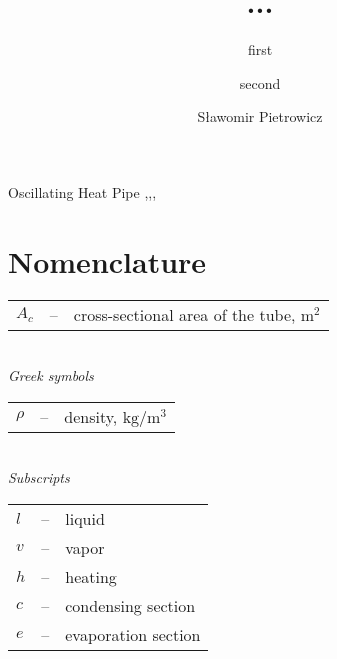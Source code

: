 \documentclass[review]{elsarticle}
\begin{document}
\begin{frontmatter}

\title{...}
 
 \author[pwr]{first}
 
 \author[pwr]{second}
   
 \author[pwr]{S\l awomir Pietrowicz}
 
 
 \address[pwr]{Department of Thermodynamics, Theory of Machines and Thermal Systems, Faculty of Mechanical and Power Engineering, Wroc\l aw University of Technology, Wroc\l aw Wybrze\.ze Wyspia\'nskiego 27, Poland}


\begin{abstract}

\end{abstract}

\begin{keyword}
Oscillating Heat Pipe \sep  \sep  \sep 
\end{keyword}

\end{frontmatter}

\linenumbers

\section*{Nomenclature}

\begin{tabular}{l c p{10.5cm}}

  $A_c$ & -- & cross-sectional area of the tube, $\mathrm{m^2}$ \\
       
\end{tabular} 
\\ 

\textit{ Greek symbols}

\begin{tabular}{l c p{10.5cm}}

  $\rho$ & -- & density, $\mathrm{kg/m^3}$ \\ 
       
\end{tabular} 
\\ 

\textit{ Subscripts}

\begin{tabular}{l c p{10.5cm}}
 
  $l$ & -- & liquid \\
  $v$ & -- & vapor \\
  $h$ & -- & heating \\
  $c$ & -- & condensing section \\
  $e$ & -- & evaporation section \\
       
\end{tabular} 
\\
\end{document}
